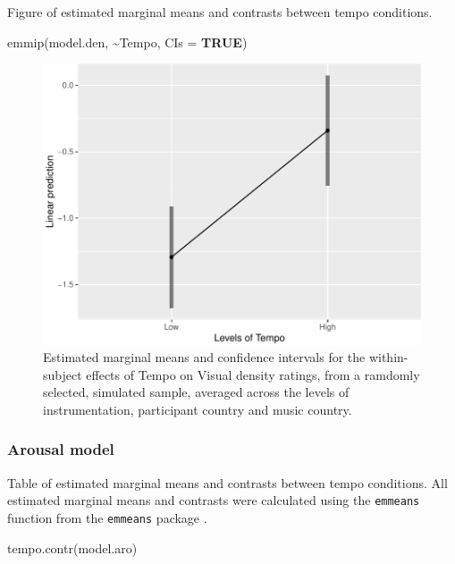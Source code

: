 \documentclass[
  bookmarksnumbered]{article}
\newenvironment{Shaded}{\begin{snugshade}}{\end{snugshade}}
\newcommand{\AttributeTok}[1]{\textcolor[rgb]{0.80,0.80,0.80}{#1}}
\newcommand{\ConstantTok}[1]{\textcolor[rgb]{0.86,0.64,0.64}{\textbf{#1}}}
\newcommand{\FunctionTok}[1]{\textcolor[rgb]{0.94,0.94,0.56}{#1}}
\newcommand{\NormalTok}[1]{\textcolor[rgb]{0.80,0.80,0.80}{#1}}
\newcommand{\SpecialCharTok}[1]{\textcolor[rgb]{0.86,0.64,0.64}{#1}}
\begin{document}
Figure of estimated marginal means and contrasts between tempo conditions.

\begin{Shaded}
\begin{Highlighting}[]
\FunctionTok{emmip}\NormalTok{(model.den, }\SpecialCharTok{\textasciitilde{}}\NormalTok{Tempo, }\AttributeTok{CIs =} \ConstantTok{TRUE}\NormalTok{)}
\end{Highlighting}
\end{Shaded}

\begin{figure}
\centering
\includegraphics{Power_analysis_files/figure-latex/unnamed-chunk-18-1.pdf}
\caption{\label{fig:unnamed-chunk-18}Estimated marginal means and confidence intervals for the within-subject effects of Tempo on Visual density ratings, from a ramdomly selected, simulated sample, averaged across the levels of instrumentation, participant country and music country.}
\end{figure}

\hypertarget{arousal-model}{%
\subsubsection{Arousal model}\label{arousal-model}}

Table of estimated marginal means and contrasts between tempo conditions. All estimated marginal means and contrasts were calculated using the \texttt{emmeans} function from the \texttt{emmeans} package \autocite{emmeanscit}.

\begin{Shaded}
\begin{Highlighting}[]
\FunctionTok{tempo.contr}\NormalTok{(model.aro)}
\end{Highlighting}
\end{Shaded}
\end{document}
